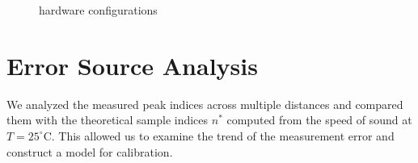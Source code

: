 \documentclass[10pt]{article}
\begin{document}
\begin{figure}[!h]
	\centering
	\caption{hardware configurations}
\label{fig:real_world_image}
\end{figure}
\section{Error Source Analysis}

We analyzed the measured peak indices across multiple distances and compared them with the theoretical sample indices $n^*$ computed from the speed of sound at $T = 25^\circ\mathrm{C}$. This allowed us to examine the trend of the measurement error and construct a model for calibration.
\end{document}
